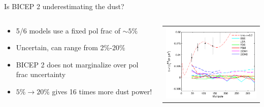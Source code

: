 \documentclass{beamer}
\begin{document}
\begin{frame}{Is BICEP 2 underestimating the dust?}
	\begin{columns}
		\begin{column}{6cm}
			\begin{itemize}
				\item<2-> 5/6 models use a fixed pol frac of $\sim 5\%$
				\item<3-> Uncertain, can range from 2\%-20\%
				\item<4-> BICEP 2 does not marginalize over pol frac uncertainty
				\item<5-> $5\% \rightarrow 20\%$ gives 16 times more dust power!
			\end{itemize}
		\end{column}
		\begin{column}{6cm}
			\begin{tabular}{c}
				\includegraphics[width=6cm]{foregroundproj.pdf}
			\end{tabular}
		\end{column}
	\end{columns}
\end{frame}
\end{document}
